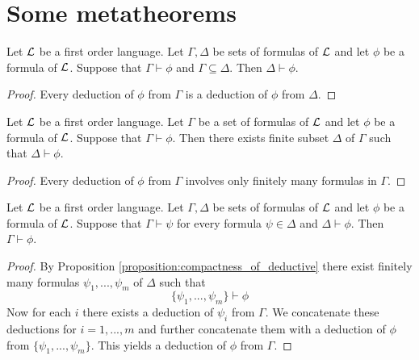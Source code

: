 \documentclass[10pt]{amsart}
\begin{document}
\section{Some metatheorems}

\begin{proposition}\label{proposition:monotonicity_of_deductive}
	Let ${\mathcal L}$ be a first order language. Let $\Gamma, \Delta$ be sets of formulas of ${\mathcal L}$ and let $\phi$ be a formula of ${\mathcal L}$. Suppose that $\Gamma \vdash \phi$ and $\Gamma \subseteq \Delta$. Then $\Delta \vdash \phi$.
\end{proposition}
\begin{proof}
	Every deduction of $\phi$ from $\Gamma$ is a deduction of $\phi$ from $\Delta$.
\end{proof}

\begin{proposition}\label{proposition:compactness_of_deductive}
	Let ${\mathcal L}$ be a first order language. Let $\Gamma$ be a set of formulas of ${\mathcal L}$ and let $\phi$ be a formula of ${\mathcal L}$. Suppose that $\Gamma \vdash \phi$. Then there exists finite subset $\Delta$ of $\Gamma$ such that $\Delta \vdash \phi$.
\end{proposition}
\begin{proof}
	Every deduction of $\phi$ from $\Gamma$ involves only finitely many formulas in $\Gamma$.
\end{proof}

\begin{proposition}\label{proposition:transitivity_of_deductive}
	Let ${\mathcal L}$ be a first order language. Let $\Gamma, \Delta$ be sets of formulas of ${\mathcal L}$ and let $\phi$ be a formula of ${\mathcal L}$. Suppose that $\Gamma \vdash \psi$ for every formula $\psi \in \Delta$ and $\Delta \vdash \phi$. Then $\Gamma \vdash \phi$.
\end{proposition}
\begin{proof}
	By Proposition \ref{proposition:compactness_of_deductive} there exist finitely many formulas $\psi_1,...,\psi_m$ of $\Delta$ such that
	$$\{\psi_1,...,\psi_m\} \vdash \phi$$
	Now for each $i$ there exists a deduction of $\psi_i$ from $\Gamma$. We concatenate these deductions for $i = 1,...,m$ and further concatenate them with a deduction of $\phi$ from $\{\psi_1,...,\psi_m\}$. This yields a deduction of $\phi$ from $\Gamma$.
\end{proof}
\end{document}
